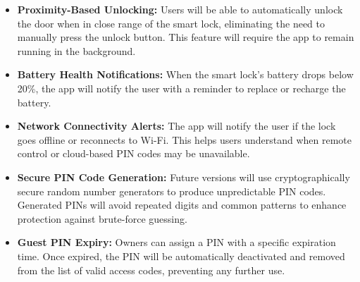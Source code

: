 \begin{itemize}
    \item \textbf{Proximity-Based Unlocking:}  
    Users will be able to automatically unlock the door when in close range of the smart lock, eliminating the need to manually press the unlock button. This feature will require the app to remain running in the background.

    \item \textbf{Battery Health Notifications:}  
    When the smart lock’s battery drops below 20\%, the app will notify the user with a reminder to replace or recharge the battery.

    \item \textbf{Network Connectivity Alerts:}  
    The app will notify the user if the lock goes offline or reconnects to Wi-Fi. This helps users understand when remote control or cloud-based PIN codes may be unavailable.

    \item \textbf{Secure PIN Code Generation:}  
    Future versions will use cryptographically secure random number generators to produce unpredictable PIN codes. Generated PINs will avoid repeated digits and common patterns to enhance protection against brute-force guessing.

    \item \textbf{Guest PIN Expiry:}  
    Owners can assign a PIN with a specific expiration time. Once expired, the PIN will be automatically deactivated and removed from the list of valid access codes, preventing any further use.

\end{itemize}
